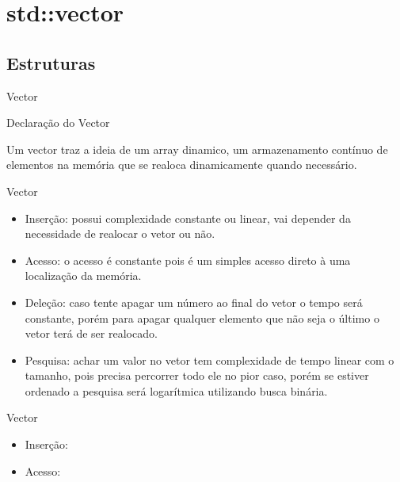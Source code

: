 \section{std::vector}

\subsection{Estruturas}

\begin{frame}[fragile]{Vector}

    \begin{block}{Declaração do Vector}
    \end{block}
	
    Um vector traz a ideia de um array dinamico, um armazenamento contínuo de elementos na memória que se realoca dinamicamente quando necessário.
    
\end{frame}

\begin{frame}[fragile]{Vector}

    \begin{itemize}
        \item Inserção: possui complexidade constante ou linear, vai depender da necessidade de realocar o vetor ou não.
        \item Acesso: o acesso é constante pois é um simples acesso direto à uma localização da memória.
        \item Deleção: caso tente apagar um número ao final do vetor o tempo será constante, porém para apagar qualquer elemento que não seja o último o vetor terá de ser realocado.
        \item Pesquisa: achar um valor no vetor tem complexidade de tempo linear com o tamanho, pois precisa percorrer todo ele no pior caso, porém se estiver ordenado a pesquisa será logarítmica utilizando busca binária.
    \end{itemize}

\end{frame}

\begin{frame}[fragile]{Vector}

    \begin{itemize}
        \item Inserção:
        \item Acesso:
    \end{itemize}

\end{frame}


